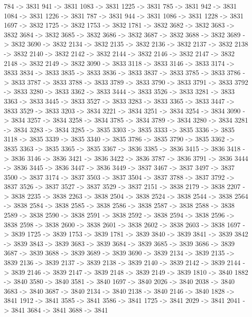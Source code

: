 {	784 -> 3831
	941 -> 3831
	1083 -> 3831
	1225 -> 3831
	785 -> 3831
	942 -> 3831
	1084 -> 3831
	1226 -> 3831
	787 -> 3831
	944 -> 3831
	1086 -> 3831
	1228 -> 3831
	1697 -> 3832
	1725 -> 3832
	1753 -> 3832
	1781 -> 3832
	3682 -> 3832
	3683 -> 3832
	3684 -> 3832
	3685 -> 3832
	3686 -> 3832
	3687 -> 3832
	3688 -> 3832
	3689 -> 3832
	3690 -> 3832
	2134 -> 3832
	2135 -> 3832
	2136 -> 3832
	2137 -> 3832
	2138 -> 3832
	2140 -> 3832
	2142 -> 3832
	2144 -> 3832
	2146 -> 3832
	2147 -> 3832
	2148 -> 3832
	2149 -> 3832
	3090 -> 3833
	3118 -> 3833
	3146 -> 3833
	3174 -> 3833
	3834 -> 3833
	3835 -> 3833
	3836 -> 3833
	3837 -> 3833
	3785 -> 3833
	3786 -> 3833
	3787 -> 3833
	3788 -> 3833
	3789 -> 3833
	3790 -> 3833
	3791 -> 3833
	3792 -> 3833
	3280 -> 3833
	3362 -> 3833
	3444 -> 3833
	3526 -> 3833
	3281 -> 3833
	3363 -> 3833
	3445 -> 3833
	3527 -> 3833
	3283 -> 3833
	3365 -> 3833
	3447 -> 3833
	3529 -> 3833
	3203 -> 3834
	3221 -> 3834
	3251 -> 3834
	3254 -> 3834
	3090 -> 3834
	3257 -> 3834
	3258 -> 3834
	3785 -> 3834
	3789 -> 3834
	3280 -> 3834
	3281 -> 3834
	3283 -> 3834
	3285 -> 3835
	3303 -> 3835
	3333 -> 3835
	3336 -> 3835
	3118 -> 3835
	3339 -> 3835
	3340 -> 3835
	3786 -> 3835
	3790 -> 3835
	3362 -> 3835
	3363 -> 3835
	3365 -> 3835
	3367 -> 3836
	3385 -> 3836
	3415 -> 3836
	3418 -> 3836
	3146 -> 3836
	3421 -> 3836
	3422 -> 3836
	3787 -> 3836
	3791 -> 3836
	3444 -> 3836
	3445 -> 3836
	3447 -> 3836
	3449 -> 3837
	3467 -> 3837
	3497 -> 3837
	3500 -> 3837
	3174 -> 3837
	3503 -> 3837
	3504 -> 3837
	3788 -> 3837
	3792 -> 3837
	3526 -> 3837
	3527 -> 3837
	3529 -> 3837
	2151 -> 3838
	2179 -> 3838
	2207 -> 3838
	2235 -> 3838
	2263 -> 3838
	2504 -> 3838
	2524 -> 3838
	2544 -> 3838
	2564 -> 3838
	2584 -> 3838
	2585 -> 3838
	2586 -> 3838
	2587 -> 3838
	2588 -> 3838
	2589 -> 3838
	2590 -> 3838
	2591 -> 3838
	2592 -> 3838
	2594 -> 3838
	2596 -> 3838
	2598 -> 3838
	2600 -> 3838
	2601 -> 3838
	2602 -> 3838
	2603 -> 3838
	1697 -> 3839
	1725 -> 3839
	1753 -> 3839
	1781 -> 3839
	3840 -> 3839
	3841 -> 3839
	3842 -> 3839
	3843 -> 3839
	3683 -> 3839
	3684 -> 3839
	3685 -> 3839
	3686 -> 3839
	3687 -> 3839
	3688 -> 3839
	3689 -> 3839
	3690 -> 3839
	2134 -> 3839
	2135 -> 3839
	2136 -> 3839
	2137 -> 3839
	2138 -> 3839
	2140 -> 3839
	2142 -> 3839
	2144 -> 3839
	2146 -> 3839
	2147 -> 3839
	2148 -> 3839
	2149 -> 3839
	1810 -> 3840
	1882 -> 3840
	3580 -> 3840
	3581 -> 3840
	1697 -> 3840
	2026 -> 3840
	2038 -> 3840
	3683 -> 3840
	3687 -> 3840
	2134 -> 3840
	2138 -> 3840
	2146 -> 3840
	1828 -> 3841
	1912 -> 3841
	3585 -> 3841
	3586 -> 3841
	1725 -> 3841
	2029 -> 3841
	2041 -> 3841
	3684 -> 3841
	3688 -> 3841
}
